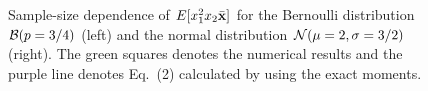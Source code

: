 \documentclass[a4paper]{article}
\newcommand{\ex}[1]{E[ #1 ]}
\newcommand{\xb}{\bar{\bf x}}
\begin{document}
\begin{figure}
  \begin{center}
  \end{center}
  \caption{Sample-size dependence of $\ex{x_1^2 x_2 \xb}$ for the Bernoulli distribution ${\cal B}(p=3/4)$ (left) and the normal distribution ${\cal N}(\mu=2,\sigma=3/2)$ (right). The green squares denotes the numerical results and the purple line denotes Eq.~(2) calculated by using the exact moments.}
\end{figure}
\end{document}
